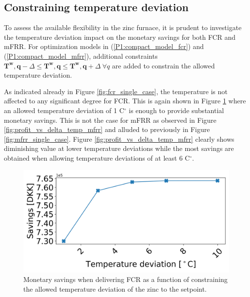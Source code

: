 \documentclass[sigconf]{acmart}
\begin{document}
\subsection{Constraining temperature deviation}

To assess the available flexibility in the zinc furnace, it is prudent to investigate the temperature deviation impact on the monetary savings for both FCR and mFRR. For optimization models in (\ref{P1:compact_model_fcr}) and (\ref{P1:compact_model_mfrr}), additional constraints $\bm{T^{w},q} - \Delta \leq \bm{T^{w},q} \leq \bm{T^{w},q} + \Delta \ \forall{q}$ are added to constrain the allowed temperature deviation.

As indicated already in Figure \ref{fig:fcr_single_case}, the temperature is not affected to any significant degree for FCR. This is again shown in Figure \ref{fig:profit_vs_delta_temp_fcr} where an allowed temperature deviation of 1 C$^{\circ}$ is enough to provide substantial monetary savings. This is not the case for mFRR as observed in Figure \ref{fig:profit_vs_delta_temp_mfrr} and alluded to previously in Figure \ref{fig:mfrr_single_case}. Figure \ref{fig:profit_vs_delta_temp_mfrr} clearly shows diminishing value at lower temperature deviations while the most savings are obtained when allowing temperature deviations of at least 6 C$^{\circ}$.

\begin{figure}[t]
    \centering
    \includegraphics[width=\columnwidth]{figures/profit_vs_delta_temp_fcr.png}
    \caption{Monetary savings when delivering FCR as a function of constraining the allowed temperature deviation of the zinc to the setpoint.}
    \label{fig:profit_vs_delta_temp_fcr}
\end{figure}


\end{document}
